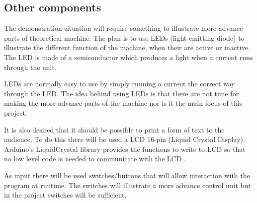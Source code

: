 \subsection{Other components}
The demonstration situation will require something to illustrate more advance parts of theoretical machine. The plan is to use LEDs (light emitting diode) to illustrate the different function of the machine, when their are active or inactive. The LED is made of a semiconductor which produces a light when a current runs through the unit.

LEDs are normally easy to use by simply running a current the correct way through the LED.
The idea behind using LEDs is that there are not time for making the more advance parts of the machine nor is it the main focus of this project.

It is also desired that it should be possible to print a form of text to the audience. To do this there will be used a LCD 16-pin (Liquid Crystal Display). Arduino's LiquidCrystal library provides the functions to write to LCD so that no low level code is needed to communicate with the LCD \citep{ArduinoLCD}.

As input there will be used switches/buttons that will allow interaction with the program at runtime. The switches will illustrate a more advance control unit but in the project switches will be sufficient.